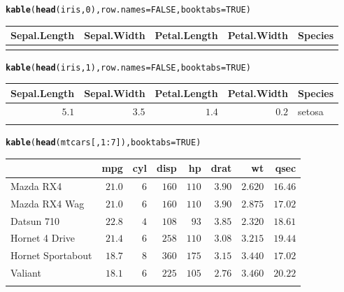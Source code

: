 \documentclass{article}\usepackage[]{graphicx}\usepackage[]{color}
\makeatletter
\newcommand{\hlnum}[1]{\textcolor[rgb]{0.686,0.059,0.569}{#1}}%
\newcommand{\hlopt}[1]{\textcolor[rgb]{0,0,0}{#1}}%
\newcommand{\hlstd}[1]{\textcolor[rgb]{0.345,0.345,0.345}{#1}}%
\newcommand{\hlkwc}[1]{\textcolor[rgb]{0.333,0.667,0.333}{#1}}%
\newcommand{\hlkwd}[1]{\textcolor[rgb]{0.737,0.353,0.396}{\textbf{#1}}}%
\newenvironment{kframe}{%
 \def\at@end@of@kframe{}%
 \ifinner\ifhmode%
  \def\at@end@of@kframe{\end{minipage}}%
  \begin{minipage}{\columnwidth}%
 \fi\fi%
 \def\FrameCommand##1{\hskip\@totalleftmargin \hskip-\fboxsep
 \colorbox{shadecolor}{##1}\hskip-\fboxsep
     \hskip-\linewidth \hskip-\@totalleftmargin \hskip\columnwidth}%
 \MakeFramed {\advance\hsize-\width
   \@totalleftmargin\z@ \linewidth\hsize
   \@setminipage}}%
 {\par\unskip\endMakeFramed%
 \at@end@of@kframe}
\makeatother
\begin{document}
\begin{kframe}\begin{alltt}
\hlkwd{kable}\hlstd{(}\hlkwd{head}\hlstd{(iris,} \hlnum{0}\hlstd{),} \hlkwc{row.names} \hlstd{=} \hlnum{FALSE}\hlstd{,} \hlkwc{booktabs} \hlstd{=} \hlnum{TRUE}\hlstd{)}
\end{alltt}
\end{kframe}
\begin{tabular}{rrrrl}
\toprule{}
Sepal.Length & Sepal.Width & Petal.Length & Petal.Width & Species\\


\bottomrule{}
\end{tabular}

\begin{kframe}\begin{alltt}
\hlkwd{kable}\hlstd{(}\hlkwd{head}\hlstd{(iris,} \hlnum{1}\hlstd{),} \hlkwc{row.names} \hlstd{=} \hlnum{FALSE}\hlstd{,} \hlkwc{booktabs} \hlstd{=} \hlnum{TRUE}\hlstd{)}
\end{alltt}
\end{kframe}
\begin{tabular}{rrrrl}
\toprule{}
Sepal.Length & Sepal.Width & Petal.Length & Petal.Width & Species\\
\midrule{}
\(5.1\) & \(3.5\) & \(1.4\) & \(0.2\) & setosa\\
\bottomrule{}
\end{tabular}

\begin{kframe}\begin{alltt}
\hlkwd{kable}\hlstd{(}\hlkwd{head}\hlstd{(mtcars[,} \hlnum{1}\hlopt{:}\hlnum{7}\hlstd{]),} \hlkwc{booktabs} \hlstd{=} \hlnum{TRUE}\hlstd{)}
\end{alltt}
\end{kframe}
\begin{tabular}{lrrrrrrr}
\toprule{}
  & mpg & cyl & disp & hp & drat & wt & qsec\\
\midrule{}
Mazda RX4 & \(21.0\) & \(6\) & \(160\) & \(110\) & \(3.90\) & \(2.620\) & \(16.46\)\\
Mazda RX4 Wag & \(21.0\) & \(6\) & \(160\) & \(110\) & \(3.90\) & \(2.875\) & \(17.02\)\\
Datsun 710 & \(22.8\) & \(4\) & \(108\) & \(93\) & \(3.85\) & \(2.320\) & \(18.61\)\\
Hornet 4 Drive & \(21.4\) & \(6\) & \(258\) & \(110\) & \(3.08\) & \(3.215\) & \(19.44\)\\
Hornet Sportabout & \(18.7\) & \(8\) & \(360\) & \(175\) & \(3.15\) & \(3.440\) & \(17.02\)\\
\addlinespace
Valiant & \(18.1\) & \(6\) & \(225\) & \(105\) & \(2.76\) & \(3.460\) & \(20.22\)\\
\bottomrule{}
\end{tabular}
\end{document}
